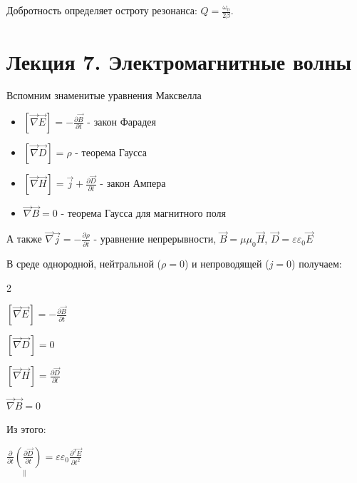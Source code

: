 \documentclass[12pt]{article}
\begin{document}
Добротность определяет остроту резонанса: $Q = \frac{\omega_0}{2\beta}$.






\section{Лекция 7. Электромагнитные волны}

Вспомним знаменитые уравнения Максвелла

\begin{itemize}
    \item $[\vec \nabla \vec E] = -\frac{\partial \vec B}{\partial t}$ - закон Фарадея

    \item $[\vec \nabla \vec D] = \rho$ - теорема Гаусса

    \item $[\vec \nabla \vec H] = \vec j + \frac{\partial \vec D}{\partial t}$ - закон Ампера

    \item $\vec \nabla \vec B = 0$ - теорема Гаусса для магнитного поля
\end{itemize}

А также $\vec \nabla \vec j = -\frac{\partial \rho}{\partial t}$ - уравнение непрерывности, $\vec B = \mu \mu_0 \vec H$, $\vec D = \varepsilon \varepsilon_0 \vec E$

В среде однородной, нейтральной ($\rho = 0$) и непроводящей ($j = 0$) получаем:

\begin{multicols}{2}
    \begin{center}
        $[\vec \nabla \vec E] = -\frac{\partial \vec B}{\partial t}$

        $[\vec \nabla \vec D] = 0$

        $[\vec \nabla \vec H] = \frac{\partial \vec D}{\partial t}$

        $\vec \nabla \vec B = 0$
    \end{center}
\end{multicols}

\mediumvspace

Из этого:

$\underset{\|}{\frac{\partial}{\partial t} \left(\frac{\partial \vec D}{\partial t}\right)} = \varepsilon \varepsilon_0 \frac{\partial^2 \vec E}{\partial t^2}$
\end{document}
